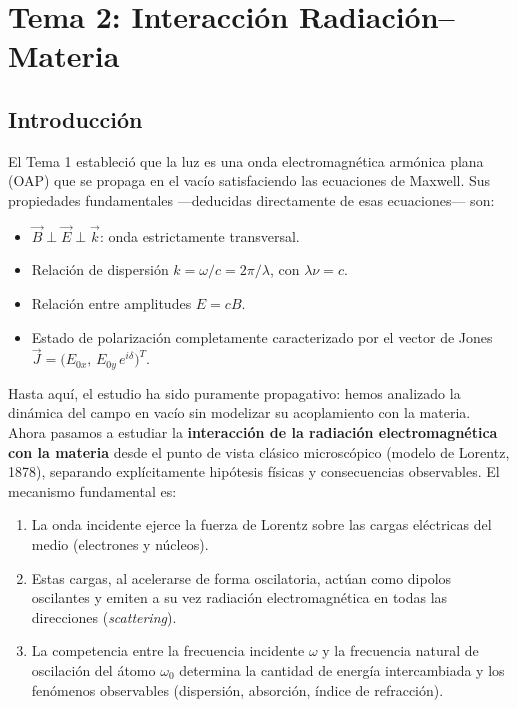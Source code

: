 \documentclass[12pt, a4paper]{article}
\theoremstyle{plain}
\theoremstyle{definition}
\theoremstyle{remark}
\newcommand{\ve}[1]{\vec{#1}}
\begin{document}
\section{Tema 2: Interacción Radiación--Materia}

\subsection{Introducción}

El Tema 1 estableció que la luz es una onda electromagnética armónica plana
(OAP) que se propaga en el vacío satisfaciendo las ecuaciones de Maxwell. Sus
propiedades fundamentales —deducidas directamente de esas ecuaciones— son:

\begin{itemize}
  \item $\ve{B}\perp\ve{E}\perp\ve{k}$: onda estrictamente transversal.
  \item Relación de dispersión $k = \omega/c = 2\pi/\lambda$, con $\lambda\nu = c$.
  \item Relación entre amplitudes $E = cB$.
  \item Estado de polarización completamente caracterizado por el vector de Jones
        $\ve{J}=\bigl(E_{0x},\,E_{0y}\,e^{i\delta}\bigr)^T$.
\end{itemize}

Hasta aquí, el estudio ha sido puramente propagativo: hemos analizado la
dinámica del campo en vacío sin modelizar su acoplamiento con la materia. Ahora
pasamos a estudiar la \textbf{interacción de la radiación electromagnética con
la materia} desde el punto de vista clásico microscópico (modelo de Lorentz,
1878), separando explícitamente hipótesis físicas y consecuencias observables.
El mecanismo fundamental es:

\begin{enumerate}
  \item La onda incidente ejerce la fuerza de Lorentz sobre las cargas eléctricas
        del medio (electrones y núcleos).
  \item Estas cargas, al acelerarse de forma oscilatoria, actúan como dipolos
        oscilantes y emiten a su vez radiación electromagnética en todas las
        direcciones (\emph{scattering}).
  \item La competencia entre la frecuencia incidente $\omega$ y la frecuencia
        natural de oscilación del átomo $\omega_0$ determina la cantidad de
        energía intercambiada y los fenómenos observables (dispersión, absorción,
        índice de refracción).
\end{enumerate}
\end{document}
